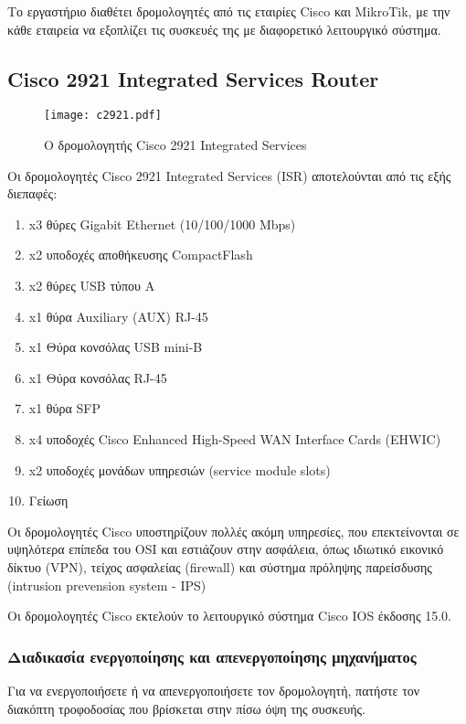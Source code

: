 \documentclass{EdipyLabs} %
\begin{document}
Το εργαστήριο διαθέτει δρομολογητές από τις εταιρίες Cisco και MikroTik, με την κάθε εταιρεία να εξοπλίζει τις συσκευές της με διαφορετικό λειτουργικό σύστημα.

\subsection{Cisco 2921 Integrated Services Router}
\begin{figure}[H]
	\centering
	\texttt{[image: c2921.pdf]}
	\caption{Ο δρομολογητής Cisco 2921 Integrated Services}\label{fig:c2921}
\end{figure}
Οι δρομολογητές Cisco 2921 Integrated Services (ISR) αποτελούνται από τις εξής διεπαφές:
\begin{enumerate}
\item x3 θύρες Gigabit Ethernet (10/100/1000 Mbps)
\item x2 υποδοχές αποθήκευσης CompactFlash
\item x2 θύρες USB τύπου A
\item x1 θύρα Auxiliary (AUX) RJ-45
\item x1 Θύρα κονσόλας USB mini-B
\item x1 Θύρα κονσόλας RJ-45
\item x1 θύρα SFP
\item x4 υποδοχές Cisco Enhanced High-Speed WAN Interface Cards (EHWIC)
\item x2 υποδοχές μονάδων υπηρεσιών (service module slots)
\item Γείωση
\end{enumerate} 
Οι δρομολογητές Cisco υποστηρίζουν πολλές ακόμη υπηρεσίες, που επεκτείνονται σε υψηλότερα επίπεδα του OSI και εστιάζουν στην ασφάλεια, όπως ιδιωτικό εικονικό δίκτυο (VPN), τείχος ασφαλείας (firewall) και σύστημα πρόληψης παρείσδυσης (intrusion prevension system - IPS)

Οι δρομολογητές Cisco εκτελούν το λειτουργικό σύστημα Cisco IOS έκδοσης 15.0.

\subsubsection*{Διαδικασία ενεργοποίησης και απενεργοποίησης μηχανήματος}
Για να ενεργοποιήσετε ή να απενεργοποιήσετε τον δρομολογητή, πατήστε τον διακόπτη τροφοδοσίας που βρίσκεται στην πίσω όψη της συσκευής. 

\newpage
\end{document}
